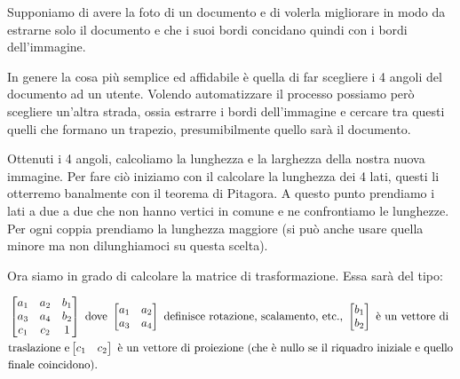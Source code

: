 \vspace{1em} \noindent
Supponiamo di avere la foto di un documento e di volerla migliorare in modo da estrarne solo il documento e che i suoi bordi concidano quindi con i bordi dell'immagine.

\vspace{1em} \noindent
In genere la cosa più semplice ed affidabile è quella di far scegliere i 4 angoli del documento ad un utente. Volendo automatizzare il processo possiamo però scegliere un'altra strada, ossia estrarre i bordi dell'immagine e cercare tra questi quelli che formano un trapezio, presumibilmente quello sarà il documento.

\vspace{1em} \noindent
Ottenuti i 4 angoli, calcoliamo la lunghezza e la larghezza della nostra nuova immagine. Per fare ciò iniziamo con il calcolare la lunghezza dei 4 lati, questi li otterremo banalmente con il teorema di Pitagora. A questo punto prendiamo i lati a due a due che non hanno vertici in comune e ne confrontiamo le lunghezze.\\
Per ogni coppia prendiamo la lunghezza maggiore (si può anche usare quella minore ma non dilunghiamoci su questa scelta).

\vspace{1em} \noindent
Ora siamo in grado di calcolare la matrice di trasformazione. Essa sarà del tipo:

\begin{align*}
&\begin{bmatrix}
a_1&a_2&b_1\\
a_3&a_4&b_2\\
c_1&c_2&1
\end{bmatrix}
\text{ dove }
\begin{bmatrix}
a_1&a_2\\
a_3&a_4
\end{bmatrix}
\text{ definisce rotazione, scalamento, etc., } 
\begin{bmatrix}
b_1\\
b_2
\end{bmatrix}
\text{ è un vettore di}\\
&\text{traslazione e} 
\newline
\begin{bmatrix}
c_1&c_2
\end{bmatrix}
\text{ è un vettore di proiezione (che è nullo se il riquadro iniziale e quello}\\
&\text{finale coincidono).}\\
\end{align*}

